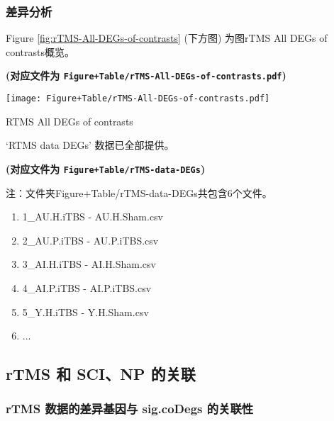 \documentclass[
]{article}
\providecommand{\tightlist}{%
  \setlength{\itemsep}{0pt}\setlength{\parskip}{0pt}}
\begin{document}
\hypertarget{ux5deeux5f02ux5206ux6790-2}{%
\subsubsection{差异分析}\label{ux5deeux5f02ux5206ux6790-2}}

Figure \ref{fig:rTMS-All-DEGs-of-contrasts} (下方图) 为图rTMS All DEGs of contrasts概览。

\textbf{(对应文件为 \texttt{Figure+Table/rTMS-All-DEGs-of-contrasts.pdf})}

\def\@captype{figure}
\begin{center}
\texttt{[image: Figure+Table/rTMS-All-DEGs-of-contrasts.pdf]}
\caption{RTMS All DEGs of contrasts}\label{fig:rTMS-All-DEGs-of-contrasts}
\end{center}

`RTMS data DEGs' 数据已全部提供。

\textbf{(对应文件为 \texttt{Figure+Table/rTMS-data-DEGs})}

\begin{center}\begin{tcolorbox}[colback=gray!10, colframe=gray!50, width=0.9\linewidth, arc=1mm, boxrule=0.5pt]注：文件夹Figure+Table/rTMS-data-DEGs共包含6个文件。

\begin{enumerate}\tightlist
\item 1\_AU.H.iTBS - AU.H.Sham.csv
\item 2\_AU.P.iTBS - AU.P.iTBS.csv
\item 3\_AI.H.iTBS - AI.H.Sham.csv
\item 4\_AI.P.iTBS - AI.P.iTBS.csv
\item 5\_Y.H.iTBS - Y.H.Sham.csv
\item ...
\end{enumerate}\end{tcolorbox}
\end{center}

\hypertarget{rtms-ux548c-scinp-ux7684ux5173ux8054-1}{%
\subsection{rTMS 和 SCI、NP 的关联}\label{rtms-ux548c-scinp-ux7684ux5173ux8054-1}}

\hypertarget{mapping}{%
\subsubsection{rTMS 数据的差异基因与 sig.coDegs 的关联性}\label{mapping}}
\end{document}
